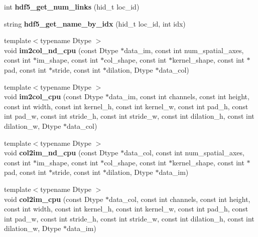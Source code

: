 \begin{DoxyCompactItemize}
\item 
int {\bfseries hdf5\+\_\+get\+\_\+num\+\_\+links} (hid\+\_\+t loc\+\_\+id)\hypertarget{namespacecaffe_af264874274a4bd45b677bfef7e3bdc1c}{}\label{namespacecaffe_af264874274a4bd45b677bfef7e3bdc1c}

\item 
string {\bfseries hdf5\+\_\+get\+\_\+name\+\_\+by\+\_\+idx} (hid\+\_\+t loc\+\_\+id, int idx)\hypertarget{namespacecaffe_ac77f870cd203946f61302327a8daa587}{}\label{namespacecaffe_ac77f870cd203946f61302327a8daa587}

\item 
{\footnotesize template$<$typename Dtype $>$ }\\void {\bfseries im2col\+\_\+nd\+\_\+cpu} (const Dtype $\ast$data\+\_\+im, const int num\+\_\+spatial\+\_\+axes, const int $\ast$im\+\_\+shape, const int $\ast$col\+\_\+shape, const int $\ast$kernel\+\_\+shape, const int $\ast$pad, const int $\ast$stride, const int $\ast$dilation, Dtype $\ast$data\+\_\+col)\hypertarget{namespacecaffe_a463706709984840b548f4f90f3348fd4}{}\label{namespacecaffe_a463706709984840b548f4f90f3348fd4}

\item 
{\footnotesize template$<$typename Dtype $>$ }\\void {\bfseries im2col\+\_\+cpu} (const Dtype $\ast$data\+\_\+im, const int channels, const int height, const int width, const int kernel\+\_\+h, const int kernel\+\_\+w, const int pad\+\_\+h, const int pad\+\_\+w, const int stride\+\_\+h, const int stride\+\_\+w, const int dilation\+\_\+h, const int dilation\+\_\+w, Dtype $\ast$data\+\_\+col)\hypertarget{namespacecaffe_a2cdc1aff8ca2c529244c102abc8c0915}{}\label{namespacecaffe_a2cdc1aff8ca2c529244c102abc8c0915}

\item 
{\footnotesize template$<$typename Dtype $>$ }\\void {\bfseries col2im\+\_\+nd\+\_\+cpu} (const Dtype $\ast$data\+\_\+col, const int num\+\_\+spatial\+\_\+axes, const int $\ast$im\+\_\+shape, const int $\ast$col\+\_\+shape, const int $\ast$kernel\+\_\+shape, const int $\ast$pad, const int $\ast$stride, const int $\ast$dilation, Dtype $\ast$data\+\_\+im)\hypertarget{namespacecaffe_a150b43194bdd49662ea08714dcdf9f1b}{}\label{namespacecaffe_a150b43194bdd49662ea08714dcdf9f1b}

\item 
{\footnotesize template$<$typename Dtype $>$ }\\void {\bfseries col2im\+\_\+cpu} (const Dtype $\ast$data\+\_\+col, const int channels, const int height, const int width, const int kernel\+\_\+h, const int kernel\+\_\+w, const int pad\+\_\+h, const int pad\+\_\+w, const int stride\+\_\+h, const int stride\+\_\+w, const int dilation\+\_\+h, const int dilation\+\_\+w, Dtype $\ast$data\+\_\+im)\hypertarget{namespacecaffe_a0bad496a30ad02eea6f8da9efe1e3882}{}\label{namespacecaffe_a0bad496a30ad02eea6f8da9efe1e3882}


\end{DoxyCompactItemize}
